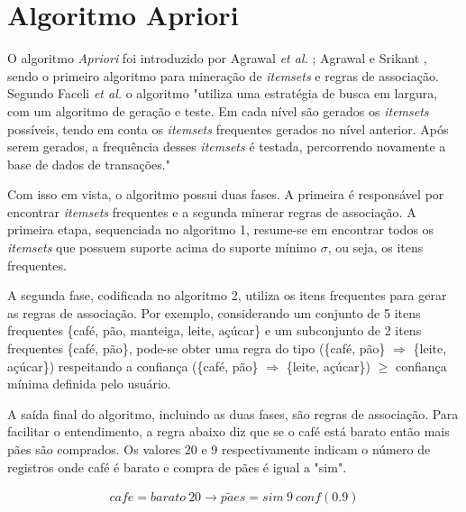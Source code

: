 \documentclass[tg]{mdtufsm}
\begin{document}
\section{Algoritmo Apriori}

O algoritmo \textit{Apriori} foi introduzido por Agrawal \textit{et al.} \citeyearpar{AgrawalIS93}; Agrawal e Srikant  \citeyearpar{AgrawalS94}, sendo o primeiro algoritmo para mineração de \textit{itemsets} e regras de associação. Segundo Faceli \textit{et al.} \citeyearpar{faceli} o algoritmo "utiliza uma estratégia de busca em largura, com um algoritmo de geração e teste. Em cada nível são gerados os \textit{itemsets} possíveis, tendo em conta os \textit{itemsets} frequentes gerados no nível anterior. Após serem gerados, a frequência desses \textit{itemsets} é testada, percorrendo novamente a base de dados de transações."

Com isso em vista, o algoritmo possui duas fases. A primeira é responsável por encontrar \textit{itemsets} frequentes e a segunda minerar regras de associação. A primeira etapa, sequenciada no algoritmo 1, resume-se em encontrar todos os \textit{itemsets} que possuem suporte acima do suporte mínimo $\sigma$, ou seja, os itens frequentes. 

A segunda fase, codificada no algoritmo 2, utiliza os itens frequentes para gerar as regras de associação. Por exemplo, considerando um conjunto de 5 itens frequentes \{café, pão, manteiga, leite, açúcar\} e um subconjunto de 2 itens frequentes \{café,  pão\}, pode-se obter uma regra do tipo (\{café, pão\} $\Longrightarrow$ \{leite, açúcar\}) respeitando a confiança (\{café, pão\} $\Longrightarrow$ \{leite, açúcar\}) $\ge$ confiança mínima definida pelo usuário.

A saída final do algoritmo, incluindo as duas fases, são regras de associação. Para facilitar o entendimento, a regra abaixo diz que se o café está barato então mais pães são comprados. Os valores 20 e 9 respectivamente indicam o número de registros onde café é barato e compra de pães é igual a "sim".

\begin{gather*} 
cafe = barato\ 20 \rightarrow p\tilde{a}es = sim\ 9\ conf(0.9)
\end{gather*} 
\end{document}

